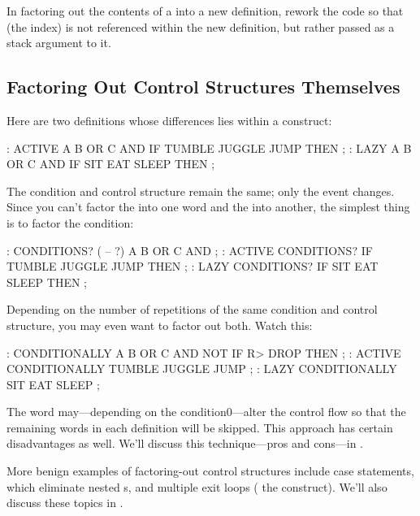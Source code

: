 \begin{tip}
In factoring out the contents of a  into a new
definition, rework the code so that  (the index) is not
referenced within the new definition, but rather passed as a stack
argument to it.
\end{tip}

\subsection{Factoring Out Control Structures Themselves}

Here are two definitions whose differences lies within a  construct:

\begin{Code}
: ACTIVE    A B OR  C AND  IF  TUMBLE JUGGLE JUMP THEN ;
: LAZY      A B OR  C AND  IF   SIT  EAT  SLEEP   THEN ;
\end{Code}
The condition and control structure remain the same; only the event
changes. Since you can't factor the  into one word and the
 into another, the simplest thing is to factor the
condition:

\begin{Code}
: CONDITIONS? ( -- ?) A B OR C AND ;
: ACTIVE    CONDITIONS? IF TUMBLE JUGGLE JUMP THEN ;
: LAZY      CONDITIONS? IF    SIT  EAT  SLEEP THEN ;
\end{Code}

\noindent 
Depending on the number of repetitions of the same condition and
control structure, you may even want to factor out both. Watch this:

\begin{Code}
: CONDITIONALLY   A B OR  C AND NOT IF  R> DROP   THEN ;
: ACTIVE   CONDITIONALLY   TUMBLE JUGGLE JUMP ;
: LAZY   CONDITIONALLY  SIT  EAT  SLEEP ;
\end{Code}
The word  may---depending on the condition0---alter
the control flow so that the remaining words in each definition will be
skipped. This approach has certain disadvantages as well. We'll
discuss this technique---pros and cons---in .

More benign examples of factoring-out control structures include case
statements, which eliminate nested s, and multiple exit loops ( the  construct). We'll also discuss these topics in
.

